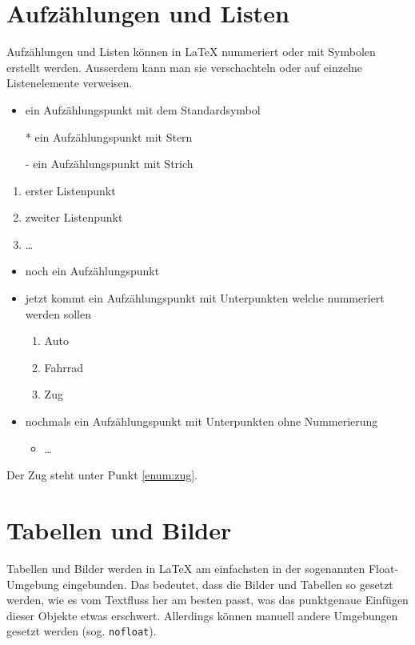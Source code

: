 \documentclass[paper=a4    %
,twoside=false             %
,fontsize=12pt             %
,DIV=11                    %
,parskip=half		   %
]{scrartcl}
\begin{document}
\section{Aufz\"ahlungen und Listen}
Aufz\"ahlungen und Listen k\"onnen in \LaTeX{} nummeriert oder mit Symbolen erstellt werden. Ausserdem kann man sie verschachteln oder auf einzelne Listenelemente verweisen.
\begin{itemize}
	\item ein Aufz\"ahlungspunkt mit dem Standardsymbol
	\item [*] ein Aufz\"ahlungspunkt mit Stern
	\item [-] ein Aufz\"ahlungspunkt mit Strich
\end{itemize}
\begin{enumerate}
	\item erster Listenpunkt
	\item zweiter Listenpunkt
	\item \dots
\end{enumerate}
\begin{itemize}
	\item noch ein Aufz\"ahlungspunkt
	\item jetzt kommt ein Aufz\"ahlungspunkt mit Unterpunkten welche nummeriert werden sollen
	\begin{enumerate}
		\item Auto
		\item Fahrrad
		\item Zug \label{enum:zug}
	\end{enumerate}
	\item nochmals ein Aufz\"ahlungspunkt mit Unterpunkten ohne Nummerierung
	\begin{itemize}
		\item \dots
	\end{itemize}	
\end{itemize}
Der Zug steht unter Punkt \ref{enum:zug}.
\section{Tabellen und Bilder}
Tabellen und Bilder werden in \LaTeX{} am einfachsten in der sogenannten Float-Umgebung eingebunden. Das bedeutet, dass die Bilder und Tabellen so gesetzt werden, wie es vom Textfluss her am besten passt, was das punktgenaue Einf\"ugen dieser Objekte etwas erschwert. Allerdings k\"onnen manuell andere Umgebungen gesetzt werden (sog. \texttt{nofloat}).
\end{document}
